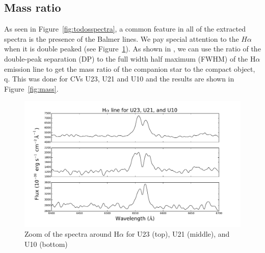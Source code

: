 \subsection{Mass ratio}

As seen in Figure~\ref{fig:todosspectra}, a common feature in all of the extracted spectra is the presence of the Balmer lines. We pay special attention to the $H\alpha$ when it is double peaked (see Figure~\ref{fig:halphatodos}). As shown in \cite{casares_massration_20016}, we can use the ratio of the double-peak separation (DP) to the full width half maximum (FWHM) of the H$\alpha$ emission line to get the mass ratio of the companion star to the compact object, q. This was done for CVs U23, U21 and U10 and the results are shown in Figure~\ref{fig:mass}.

\begin{figure}[]
        \centering
        \includegraphics[scale=.5]{assets/images/todos.pdf}
\caption{Zoom of the spectra around H$\alpha$ for U23 (top), U21 (middle), and U10 (bottom)}
\label{fig:halphatodos}
\end{figure}

